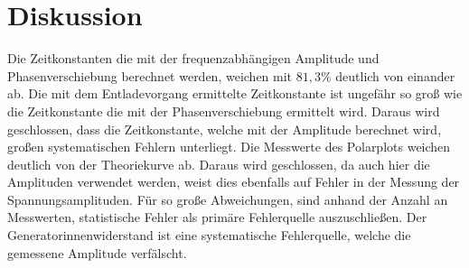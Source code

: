 \section{Diskussion}
\label{sec:Diskussion}

Die Zeitkonstanten die mit der frequenzabhängigen Amplitude und Phasenverschiebung berechnet werden, weichen mit $81,3\%$
deutlich von einander ab.
Die mit dem Entladevorgang ermittelte Zeitkonstante ist ungefähr so groß wie die Zeitkonstante die mit der
Phasenverschiebung ermittelt wird. Daraus wird geschlossen, dass die Zeitkonstante, welche mit der Amplitude
berechnet wird, großen systematischen Fehlern unterliegt.
Die Messwerte des Polarplots weichen deutlich von der Theoriekurve ab. Daraus wird geschlossen, da auch hier die
Amplituden verwendet werden, weist dies ebenfalls auf Fehler in der Messung der Spannungsamplituden. Für so
große Abweichungen, sind anhand der Anzahl an Messwerten, statistische Fehler als primäre Fehlerquelle auszuschließen.
Der Generatorinnenwiderstand ist eine systematische Fehlerquelle, welche die gemessene Amplitude verfälscht.
